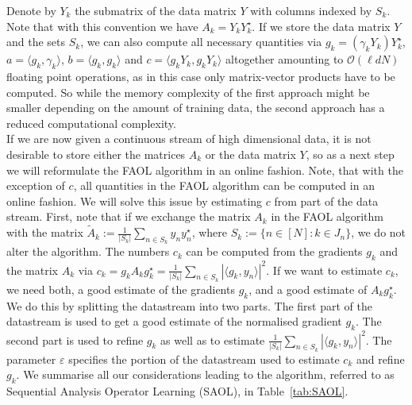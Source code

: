 \documentclass[11pt, onecolumn, journal,compsoc]{IEEEtran}
\newcommand\ip[2]{\langle #1, #2\rangle}
\newcommand\eps{\varepsilon}
\newcommand{\Ocal}{\mathcal{O}}
\theoremstyle{plain}
\theoremstyle{remark}
\begin{document}
Denote by $Y_k$ the submatrix of the data matrix $Y$ with columns indexed by $S_k$. Note that with this convention we have $A_k = Y_k Y_k^\star$. If we store the data matrix $Y$ and the sets $S_k$, we can also compute all necessary quantities via
$g_k = (\gamma_k Y_k) Y_k^\star$, $a = \ip{g_k}{\gamma_k}$, $b = \ip{g_k}{g_k}$ and $c = \ip{g_k Y_k}{g_k Y_k}$ altogether amounting to $\Ocal(\ell dN)$ floating point operations, as in this case only matrix-vector products have to be computed. So while the memory complexity of the first approach might be smaller depending on the amount of training data, the second approach has a reduced computational complexity.\\
If we are now given a continuous stream of high dimensional data, it is not desirable to store either the matrices $A_k$ or the data matrix $Y$, so as a next step we will reformulate the FAOL algorithm in an online fashion. Note, that with the exception of $c$, all quantities in the FAOL algorithm can be computed in an online fashion.
We will solve this issue by estimating $c$ from part of the data stream. First, note that if we exchange the matrix $A_k$ in the FAOL algorithm with the matrix $\tilde A_k :=\frac{1}{|S_k|} \sum_{n\in S_k} y_n y_n^\star$, where $S_k:= \{n\in[N]\colon k\in J_n\}$, we do not alter the algorithm.
The numbers $c_k$ can be computed from the gradients $g_k$ and the matrix $A_k$ via $c_k = g_k A_k g_k^{\star}=\tfrac{1}{|S_k|}\sum_{n\in S_k} |\ip{g_k}{y_n}|^2$. If we want to estimate $c_k$, we need both, a good estimate of the gradients $g_k$, and a good estimate of $A_k g_k^\star$.  
We do this by splitting the datastream into two parts. The first part of the datastream is used to get a good estimate of the normalised gradient $g_k$. The second part is used to refine $g_k$ as well as to estimate $ \tfrac{1}{|S_k|}\sum_{n\in S_k} |\ip{g_k}{y_n}|^2$. The parameter $\eps$ specifies the portion of the datastream used to estimate $c_k$ and refine $g_k$. We summarise all our considerations leading to the algorithm, referred to as Sequential Analysis Operator Learning (SAOL), in Table~\ref{tab:SAOL}.\\
%
\end{document}

